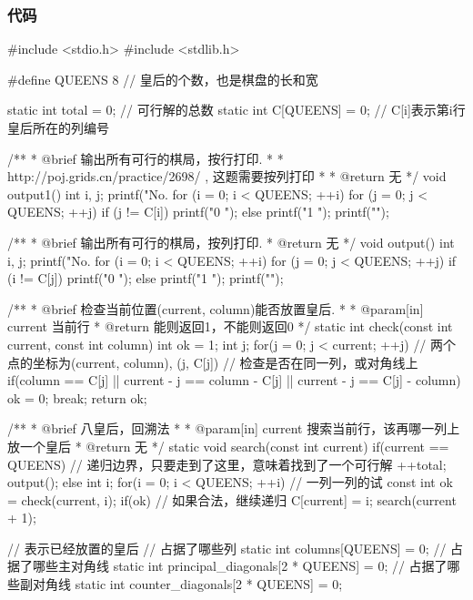 \subsubsection{代码}
\begin{Codex}[label=eight_queen.c]
#include <stdio.h>
#include <stdlib.h>

#define QUEENS 8 // 皇后的个数，也是棋盘的长和宽

static int total = 0;	// 可行解的总数
static int C[QUEENS] = {0};	// C[i]表示第i行皇后所在的列编号

/** 
 * @brief 输出所有可行的棋局，按行打印.
 *
 * http://poj.grids.cn/practice/2698/ , 这题需要按列打印
 *
 * @return 无
 */
void output1() {
    int i, j;
    printf("No. %
    for (i = 0; i < QUEENS; ++i) {
        for (j = 0; j < QUEENS; ++j) {
            if (j != C[i]) {
                printf("0 ");
            } else {
                printf("1 ");
            }
        }
        printf("\n");
    }
}

/** 
 * @brief 输出所有可行的棋局，按列打印.
 * @return 无
 */
void output() {
    int i, j;
    printf("No. %
    for (i = 0; i < QUEENS; ++i) {
        for (j = 0; j < QUEENS; ++j) {
            if (i != C[j]) {
                printf("0 ");
            } else {
                printf("1 ");
            }
        }
        printf("\n");
    }
}

/** 
 * @brief 检查当前位置(current, column)能否放置皇后.
 *
 * @param[in] current 当前行
 * @return 能则返回1，不能则返回0
 */
static int check(const int current, const int column) {
    int ok = 1;
    int j;
    for(j = 0; j < current; ++j) {
        // 两个点的坐标为(current, column), (j, C[j])
        // 检查是否在同一列，或对角线上
        if(column == C[j] || current - j == column - C[j] || 
            current - j == C[j] - column) {
            ok = 0;
            break;
        }
    }
    return ok;
}

/** 
 * @brief 八皇后，回溯法
 *
 * @param[in] current 搜索当前行，该再哪一列上放一个皇后
 * @return 无
 */
static void search(const int current) {
    if(current == QUEENS) {  // 递归边界，只要走到了这里，意味着找到了一个可行解
        ++total;
        output();
    } else {
        int i;
        for(i = 0; i < QUEENS; ++i) {  // 一列一列的试
            const int ok = check(current, i);
            if(ok) {  // 如果合法，继续递归
                C[current] = i;
                search(current + 1);
            }
        }
    }
}

// 表示已经放置的皇后
// 占据了哪些列
static int columns[QUEENS] = {0};
// 占据了哪些主对角线
static int principal_diagonals[2 * QUEENS] = {0};
// 占据了哪些副对角线
static int counter_diagonals[2 * QUEENS] = {0};


\end{Codex}
